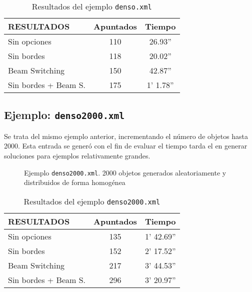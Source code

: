 \begin{table*}[!ht]
\centering
\begin{tabular}{||l||c|c||}
\hline
\hline
RESULTADOS & Apuntados & Tiempo \\
\hline
\hline
Sin opciones & 110 & 26.93'' \\
\hline
Sin bordes & 118 & 20.02'' \\
\hline
Beam Switching & 150 & 42.87'' \\
\hline
Sin bordes + Beam S. & 175 & 1' 1.78'' \\
\hline
\hline
\end{tabular}
\caption{Resultados del ejemplo \texttt{denso.xml}}
\label{tabla:denso}
\end{table*}

\subsection {Ejemplo: \texttt{denso2000.xml}}
Se trata del mismo ejemplo anterior, incrementando el número de objetos hasta 2000. 
Esta entrada se generó con el fin de evaluar el tiempo tarda el \CSUO{} en generar soluciones para ejemplos
relativamente grandes.

\begin{figure}[!htb]
\centering
{}
\caption{Ejemplo \texttt{denso2000.xml}. 2000 objetos generados aleatoriamente y distribuidos de forma homogénea}
\end{figure}

\begin{table*}[!ht]
\centering
\begin{tabular}{||l||c|c||}
\hline
\hline
RESULTADOS & Apuntados & Tiempo \\
\hline
\hline
Sin opciones & 135 & 1' 42.69'' \\
\hline
Sin bordes & 152 & 2' 17.52'' \\
\hline
Beam Switching & 217 & 3' 44.53'' \\
\hline
Sin bordes + Beam S. & 296 & 3' 20.97'' \\
\hline
\hline
\end{tabular}
\caption{Resultados del ejemplo \texttt{denso2000.xml}}
\end{table*}

